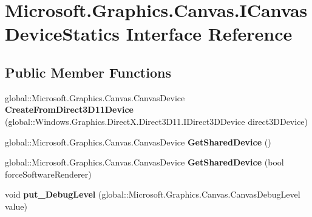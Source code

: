 \hypertarget{interface_microsoft_1_1_graphics_1_1_canvas_1_1_i_canvas_device_statics}{}\section{Microsoft.\+Graphics.\+Canvas.\+I\+Canvas\+Device\+Statics Interface Reference}
\label{interface_microsoft_1_1_graphics_1_1_canvas_1_1_i_canvas_device_statics}
\subsection*{Public Member Functions}
\begin{DoxyCompactItemize}
\item 
\mbox{\label{interface_microsoft_1_1_graphics_1_1_canvas_1_1_i_canvas_device_statics_aa4908871d26502b4e2767051688362b6}} 
global\+::\+Microsoft.\+Graphics.\+Canvas.\+Canvas\+Device {\bfseries Create\+From\+Direct3\+D11\+Device} (global\+::\+Windows.\+Graphics.\+Direct\+X.\+Direct3\+D11.\+I\+Direct3\+D\+Device direct3\+D\+Device)
\item 
\mbox{\label{interface_microsoft_1_1_graphics_1_1_canvas_1_1_i_canvas_device_statics_a980677dde098e69b5c096e2e2533711e}} 
global\+::\+Microsoft.\+Graphics.\+Canvas.\+Canvas\+Device {\bfseries Get\+Shared\+Device} ()
\item 
\mbox{\label{interface_microsoft_1_1_graphics_1_1_canvas_1_1_i_canvas_device_statics_a80dff67885dd4f6bc9a02d62a3ed0e5b}} 
global\+::\+Microsoft.\+Graphics.\+Canvas.\+Canvas\+Device {\bfseries Get\+Shared\+Device} (bool force\+Software\+Renderer)
\item 
\mbox{\label{interface_microsoft_1_1_graphics_1_1_canvas_1_1_i_canvas_device_statics_ad0fd3fa78db03abbc15b048622448383}} 
void {\bfseries put\+\_\+\+Debug\+Level} (global\+::\+Microsoft.\+Graphics.\+Canvas.\+Canvas\+Debug\+Level value)
\item 
\mbox{\label{interface_microsoft_1_1_graphics_1_1_canvas_1_1_i_canvas_device_statics_a87a1ee33571fda0a663fd8a722d12f18}} 

\end{DoxyCompactItemize}
